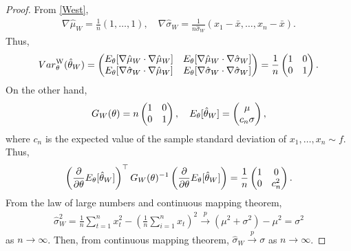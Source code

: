 \documentclass[10pt,a4paper]{amsart}
\begin{document}
\begin{proof}
	From \eqref{West},
	\begin{align*}
		\nabla \hat{\mu}_W = \frac{1}{n} \left( 1,\dots,1 \right),\quad \nabla \hat{\sigma}_W = \frac{1}{n\hat{\sigma}_W} ( x_1-\bar{x},\dots, x_n-\bar{x} ).
	\end{align*}
	Thus,
	\begin{align*}
		{\rm Var}_{\theta}^{\mathrm{W}} (\hat{\theta}_W)= \begin{pmatrix} {\rm E}_{\theta} [\nabla \hat{\mu}_W \cdot \nabla \hat{\mu}_W] & {\rm E}_{\theta} [\nabla \hat{\mu}_W \cdot \nabla \hat{\sigma}_W] \\ {\rm E}_{\theta} [\nabla \hat{\sigma}_W \cdot \nabla \hat{\mu}_W] & {\rm E}_{\theta} [\nabla \hat{\sigma}_W \cdot \nabla \hat{\sigma}_W] \end{pmatrix} = \frac{1}{n}\begin{pmatrix}
			1 & 0 \\
			0 & 1
		\end{pmatrix}.
	\end{align*}
	On the other hand, 
	\begin{align*}
		G_W(\theta)= n \begin{pmatrix}
			1 & 0 \\
			0 & 1
		\end{pmatrix}, \quad {\rm E}_{\theta}[\hat{\theta}_W]= \begin{pmatrix} \mu \\ c_n \sigma \end{pmatrix},
	\end{align*}
	where $c_n$ is the expected value of the sample standard deviation of $x_1,\dots,x_n \sim f$.
	Thus,
	\begin{align*}
		\left(\frac{\partial}{\partial \theta} {\rm E}_{\theta}[\hat{\theta}_W]\right)^\top G_W(\theta)^{-1} \left(\frac{\partial}{\partial \theta} {\rm E}_{\theta}[\hat{\theta}_W]\right) = \frac{1}{n}\begin{pmatrix}
			1 & 0 \\
			0 & c_n^2
		\end{pmatrix}.
	\end{align*}
	From the law of large numbers and continuous mapping theorem, 
	\begin{align*}
		\hat{\sigma}_W^2 = \frac{1}{n} \sum_{t=1}^n x_t^2 - \left( \frac{1}{n} \sum_{i=1}^n x_t \right)^2 \overset{p}{\to} (\mu^2+\sigma^2) - \mu^2 = \sigma^2
	\end{align*}
	as $n \to \infty$.
	Then, from continuous mapping theorem, $\hat{\sigma}_W \overset{p}{\to} \sigma$ as $n\to\infty$.

\end{proof}
\end{document}
